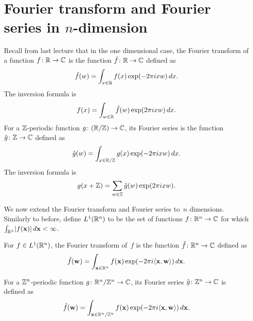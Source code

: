\documentclass[11pt]{article}
\begin{document}
\thispagestyle{fancy} %


\section{Fourier transform and Fourier series in $n$-dimension}

Recall from last lecture that in the one dimensional case, the Fourier
transform of a function $f \colon \mathbb{R} \to \mathbb{C}$ is the function
$\hat{f} \colon \mathbb{R} \to \mathbb{C}$ defined as
\[ \hat{f}(w) = \int_{x\in \mathbb{R}} f(x) \exp(-2 \pi ixw) \, dx . \] The
inversion formula is
\[ f(x) = \int_{w\in \mathbb{R}} \hat{f}(w) \exp(2 \pi ixw) \, dx. \] For a
$\mathbb{Z}$-periodic function $g \colon (\mathbb{R} / \mathbb{Z}) \to \mathbb{C}$, its Fourier series
is the function $\hat{g} \colon \mathbb{Z} \to \mathbb{C}$ defined as
\[ \hat{g}(w) = \int_{x \in \mathbb{R}/\mathbb{Z}} g(x) \exp(-2 \pi ixw) \, dx . \] The
inversion formula is
\[ g(x+\mathbb{Z}) = \sum_{w \in \mathbb{Z}} \hat{g}(w) \exp(2 \pi ixw). \]

We now extend the Fourier transform and Fourier series to~$n$
dimensions. Similarly to before, define $L^{1}(\mathbb{R}^n)$ to be the set of
functions $f \colon \mathbb{R}^n \to \mathbb{C}$ for which
$\int_{\mathbb{R}^n} \lvert f(\mathbf{x})\rvert \, d\mathbf{x} < \infty$.

\begin{definition}
  \label{def:fourier-transform}
  For $f \in L^{1}(\mathbb{R}^n)$, the Fourier transform of~$f$ is the
  function $\hat{f} \colon \mathbb{R}^{n} \to \mathbb{C}$ defined as
  \[ \hat{f}(\mathbf{w}) = \int_{\mathbf{x}\in \mathbb{R}^n} f(\mathbf{x})\exp(-2 \pi i
    \langle\mathbf{x},\mathbf{w}\rangle) \, d\mathbf{x} . \]
\end{definition}

\begin{definition}
  For a $\mathbb{Z}^{n}$-periodic function $g \colon \mathbb{R}^{n}/\mathbb{Z}^{n} \to \mathbb{C}$,
  its Fourier series $\hat{g} \colon \mathbb{Z}^{n} \to \mathbb{C}$ is defined as
  \[ \hat{f}(\mathbf{w}) = \int_{\mathbf{x}\in \mathbb{R}^n / \mathbb{Z}^n} f(\mathbf{x}) \exp(-2 \pi
    i\langle\mathbf{x},\mathbf{w}\rangle) \, d\mathbf{x} . \]
\end{definition}
\end{document}
